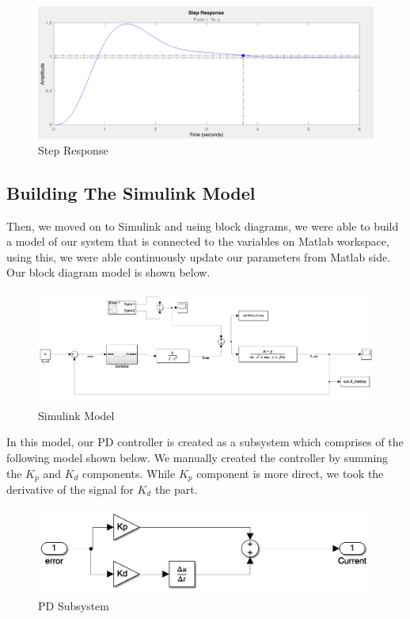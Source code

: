 \begin{figure}[H]
    \centering
    \includegraphics[width=.85\textwidth]{images/ts4.png}
    \caption{Step Response}
    \label{fig:resp}
\end{figure}

\subsection{Building The Simulink Model}

Then, we moved on to Simulink and using block diagrams, we were able to build a model of our system that is connected to the variables on Matlab workspace, using this, we were able continuously update our parameters from Matlab side. Our block diagram model is shown below.

\begin{figure}[H]
    \centering
    \includegraphics[width=.9\textwidth]{images/sim_model.png}
    \caption{Simulink Model}
    \label{fig:sim_model}
\end{figure}

In this model, our PD controller is created as a subsystem which comprises of the following model shown below. We manually created the controller by summing the $K_p$ and $K_d$ components. While $K_p$ component is more direct, we took the derivative of the signal for $K_d$ the part.

\begin{figure}[H]
    \centering
    \includegraphics[width=.6\textwidth]{images/pd_ss.png}
    \caption{PD Subsystem}
    \label{fig:pd_ss}
\end{figure}


